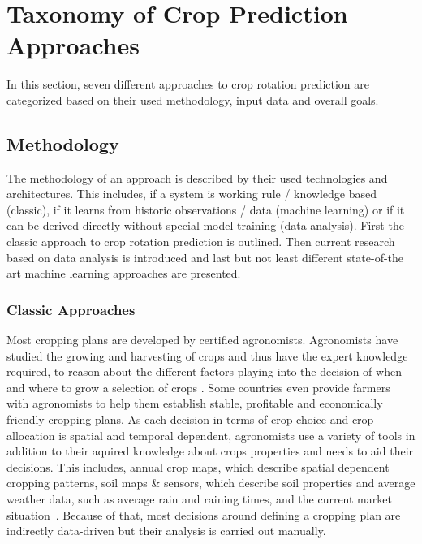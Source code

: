 \documentclass{Academic}
\begin{document}
    \section{Taxonomy of Crop Prediction Approaches}
    In this section, seven different approaches to crop rotation prediction are categorized based on their used methodology, input data and overall goals.

    \subsection{Methodology}
    The methodology of an approach is described by their used technologies and architectures. This includes, if a system is working rule / knowledge based (classic), if it learns from historic observations / data (machine learning) or if it can be derived directly without special model training (data analysis). First the classic approach to crop rotation prediction is outlined. Then current research based on data analysis is introduced and last but not least different state-of-the art machine learning approaches are presented.

    \subsubsection{Classic Approaches} %
    Most cropping plans are developed by certified agronomists. Agronomists have studied the growing and harvesting of crops and thus have the expert knowledge required, to reason about the different factors playing into the decision of when and where to grow a selection of crops \cite{dupuis_methodology_2023}. Some countries even provide farmers with agronomists to help them establish stable, profitable and economically friendly cropping plans. As each decision in terms of crop choice and crop allocation is spatial and temporal dependent, agronomists use a variety of tools in addition to their aquired knowledge about crops properties and needs to aid their decisions. This includes, annual crop maps, which describe spatial dependent cropping patterns, soil maps \& sensors, which describe soil properties and average weather data, such as average rain and raining times, and the current market situation~\cite{upcott_new_2023}. Because of that, most decisions around defining a cropping plan are indirectly data-driven but their analysis is carried out manually.
\end{document}
